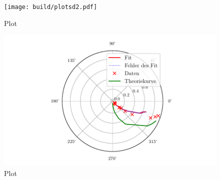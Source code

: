 \begin{figure}
  \centering
  \texttt{[image: build/plotsd2.pdf]}
  \caption{Plot}
  \label{fig:plotd2}
\end{figure}
\begin{figure}
  \centering
  \includegraphics{build/plotd3.pdf}
  \caption{Plot}
  \label{fig:plotd3}
\end{figure}

